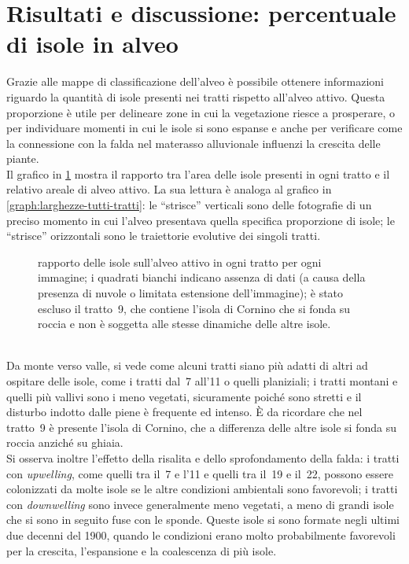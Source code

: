 \section{Risultati e discussione: percentuale di isole in alveo}
\label{sec:perc-isole-in-alveo}
Grazie alle mappe di classificazione dell'alveo è possibile ottenere informazioni riguardo la quantità di isole presenti nei tratti rispetto all'alveo attivo.
Questa proporzione è utile per delineare zone in cui la vegetazione riesce a prosperare, o per individuare momenti in cui le isole si sono espanse e anche per verificare come la connessione con la falda nel materasso alluvionale influenzi la crescita delle piante.
\\
Il grafico in \cref{graph:rapp-isl-tutti-tratti} mostra il rapporto tra l'area delle isole presenti in ogni tratto e il relativo areale di alveo attivo.
La sua lettura è analoga al grafico in \cref{graph:larghezze-tutti-tratti}: le “strisce” verticali sono delle fotografie di un preciso momento in cui l'alveo presentava quella specifica proporzione di isole; le “strisce” orizzontali sono le traiettorie evolutive dei singoli tratti.
%
\begin{figure}
	\centering
	
	\caption[rapporto delle isole sull'alveo attivo in ogni tratto per ogni immagine]{rapporto delle isole sull'alveo attivo in ogni tratto per ogni immagine; i quadrati bianchi indicano assenza di dati (a causa della presenza di nuvole o limitata estensione dell'immagine); è stato escluso il tratto~9, che contiene l'isola di Cornino che si fonda su roccia e non è soggetta alle stesse dinamiche delle altre isole.}
	\label{graph:rapp-isl-tutti-tratti}
\end{figure}
%
\\
Da monte verso valle, si vede come alcuni tratti siano più adatti di altri ad ospitare delle isole, come i tratti dal~7 all'11 o quelli planiziali;
i tratti montani e quelli più vallivi sono i meno vegetati, sicuramente poiché sono stretti e il disturbo indotto dalle piene è frequente ed intenso.
È da ricordare che nel tratto~9 è presente l'isola di Cornino, che a differenza delle altre isole si fonda su roccia anziché su ghiaia.
\\
Si osserva inoltre l'effetto della risalita e dello sprofondamento della falda:
i tratti con \emph{upwelling}, come quelli tra il~7 e l'11 e quelli tra il~19 e il~22, possono essere colonizzati da molte isole se le altre condizioni ambientali sono favorevoli; i tratti con \emph{downwelling} sono invece generalmente meno vegetati, a meno di grandi isole che si sono in seguito fuse con le sponde. Queste isole si sono formate negli ultimi due decenni del 1900, quando le condizioni erano molto probabilmente favorevoli per la crescita, l'espansione e la coalescenza di più isole.
